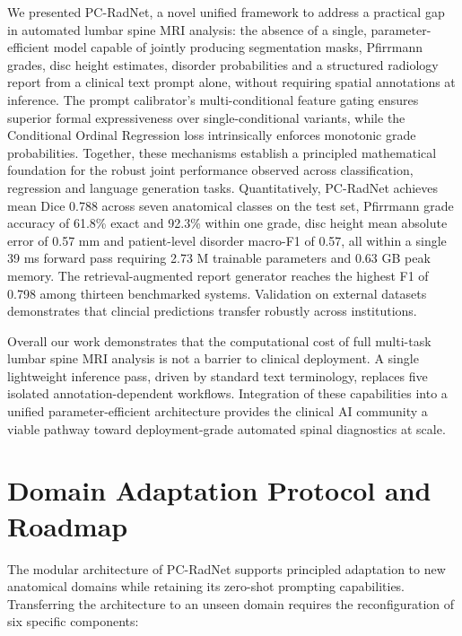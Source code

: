 \documentclass[journal]{IEEEtran}
\newcommand{\modelname}{PC-RadNet}
\begin{document}
We presented \modelname{}, a novel unified framework to address a practical gap in automated lumbar spine MRI analysis: the absence of a single, parameter-efficient model capable of jointly producing segmentation masks, Pfirrmann grades, disc height estimates, disorder probabilities and a structured radiology report from a clinical text prompt alone, without requiring spatial annotations at inference. The prompt calibrator's multi-conditional feature gating ensures superior formal expressiveness over single-conditional variants, while the Conditional Ordinal Regression loss intrinsically enforces monotonic grade probabilities. Together, these mechanisms establish a principled mathematical foundation for the robust joint performance observed across classification, regression and language generation tasks. Quantitatively, \modelname{} achieves mean Dice 0.788 across seven anatomical classes on the test set, Pfirrmann grade accuracy of 61.8\% exact and 92.3\% within one grade, disc height mean absolute error of 0.57 mm and patient-level disorder macro-F1 of 0.57, all within a single 39 ms forward pass requiring 2.73 M trainable parameters and 0.63 GB peak memory. The retrieval-augmented report generator reaches the highest F1 of 0.798 among thirteen benchmarked systems. Validation on external datasets demonstrates that clincial predictions transfer robustly across institutions. 

Overall our work demonstrates that the computational cost of full multi-task lumbar spine MRI analysis is not a barrier to clinical deployment. A single lightweight inference pass, driven by standard text terminology, replaces five isolated annotation-dependent workflows. Integration of these capabilities into a unified parameter-efficient architecture provides the clinical AI community a viable pathway toward deployment-grade automated spinal diagnostics at scale.


\appendices

\section{Domain Adaptation Protocol and Roadmap}
\label{app:generalization}

The modular architecture of \modelname{} supports principled adaptation to new anatomical domains while retaining its zero-shot prompting capabilities. Transferring the architecture to an unseen domain requires the reconfiguration of six specific components:
\end{document}
